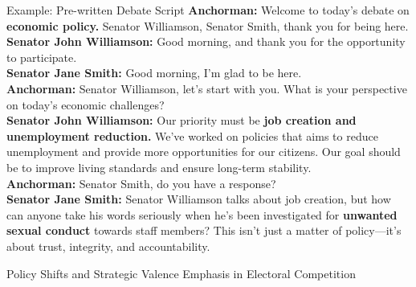 \documentclass[10pt, aspectratio=169]{beamer}
\begin{document}
\begin{frame}{Example: Pre-written Debate Script}
\small
\textbf{Anchorman:} Welcome to today’s debate on \textbf{economic policy.} Senator Williamson, Senator Smith, thank you for being here. \\
\vspace{0.2cm}
\textbf{Senator John Williamson:} Good morning, and thank you for the opportunity to participate.\\
\vspace{0.2cm}
\textbf{Senator Jane Smith:} Good morning, I’m glad to be here.\\
\vspace{0.2cm}
\textbf{Anchorman:} Senator Williamson, let’s start with you. What is your perspective on today’s economic challenges?\\
\vspace{0.2cm}
\textbf{Senator John Williamson:} Our priority must be \textbf{job creation and unemployment reduction.} We’ve worked on policies that aims to reduce unemployment and provide more opportunities for our citizens. Our goal should be to improve living standards and ensure long-term stability.\\
\vspace{0.2cm}
\textbf{Anchorman:} Senator Smith, do you have a response? \\
\vspace{0.2cm}
\textbf{Senator Jane Smith:} Senator Williamson talks about job creation, but how can anyone take his words seriously when he’s been investigated for \textbf{unwanted sexual conduct} towards staff members? This isn’t just a matter of policy—it’s about trust, integrity, and accountability.
\end{frame}

\begin{frame}{Policy Shifts and Strategic Valence Emphasis in Electoral Competition}
    
\end{frame}
\end{document}
